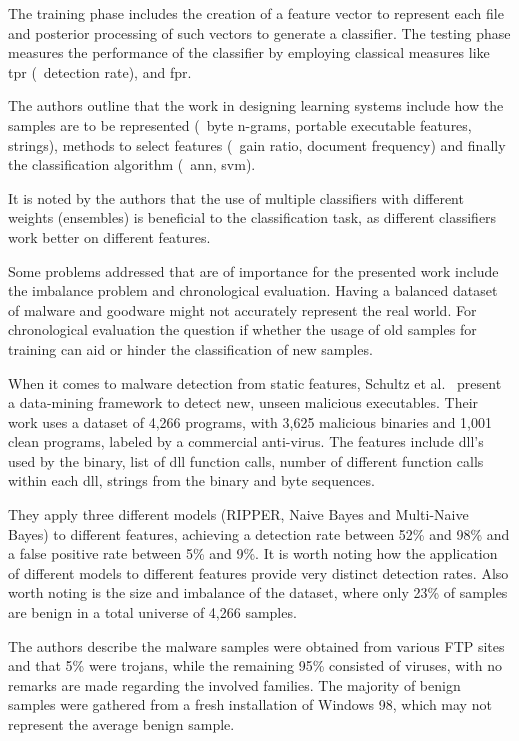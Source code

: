 The training phase includes the creation of a feature vector to represent each file and posterior processing of such vectors to generate a classifier.
The testing phase measures the performance of the classifier by employing classical measures like \gls{tpr} (\ie\ detection rate), and \gls{fpr}.

The authors outline that the work in designing learning systems include how the samples are to be represented (\eg\ byte n-grams, portable executable features, strings), methods to select features (\eg\ gain ratio, document frequency) and finally the classification algorithm (\eg\ \gls{ann}, \gls{svm}).

It is noted by the authors that the use of multiple classifiers with different weights (ensembles) is beneficial to the classification task, as different classifiers work better on different features.

Some problems addressed that are of importance for the presented work include the imbalance problem and chronological evaluation.
Having a balanced dataset of malware and goodware might not accurately represent the real world.
For chronological evaluation the question if whether the usage of old samples for training can aid or hinder the classification of new samples.

\medskip

When it comes to malware detection from static features, Schultz et al.~\cite{schultz:data_mining} present a data-mining framework to detect new, unseen malicious executables.
Their work uses a dataset of 4,266 programs, with 3,625 malicious binaries and 1,001 clean programs, labeled by a commercial anti-virus.
The features include \gls{dll}'s used by the binary, list of \gls{dll} function calls, number of different function calls within each \gls{dll}, strings from the binary and byte sequences.

They apply three different models (RIPPER, Naive Bayes and Multi-Naive Bayes) to different features, achieving a detection rate between 52\% and 98\% and a false positive rate between 5\% and 9\%.
It is worth noting how the application of different models to different features provide very distinct detection rates.
Also worth noting is the size and imbalance of the dataset, where only 23\% of samples are benign in a total universe of 4,266 samples.

The authors describe the malware samples were obtained from various FTP sites and that 5\% were trojans, while the remaining 95\% consisted of viruses, with no remarks are made regarding the involved families.
The majority of benign samples were gathered from a fresh installation of Windows 98, which may not represent the average benign sample.

